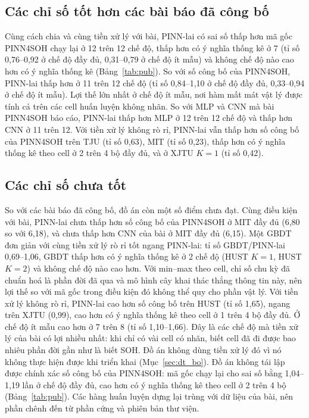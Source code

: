 \subsection{Các chỉ số tốt hơn các bài báo đã công bố}
Cùng cách chia và cùng tiền xử lý với bài, PINN-lai có sai số thấp hơn mã gốc PINN4SOH chạy lại ở 12 trên 12 chế độ, thấp hơn có ý nghĩa thống kê ở 7 (tỉ số 0{,}76--0{,}92 ở chế độ đầy đủ, 0{,}31--0{,}79 ở chế độ ít mẫu) và không chế độ nào cao hơn có ý nghĩa thống kê (Bảng~\ref{tab:pub}). So với số công bố của PINN4SOH, PINN-lai thấp hơn ở 11 trên 12 chế độ (tỉ số 0{,}84--1{,}10 ở chế độ đầy đủ, 0{,}33--0{,}94 ở chế độ ít mẫu). Lợi thế lớn nhất ở chế độ ít mẫu, nơi hàm mất mát vật lý được tính cả trên các cell huấn luyện không nhãn. So với MLP và CNN mà bài PINN4SOH báo cáo, PINN-lai thấp hơn MLP ở 12 trên 12 chế độ và thấp hơn CNN ở 11 trên 12. Với tiền xử lý không rò rỉ, PINN-lai vẫn thấp hơn số công bố của PINN4SOH trên TJU (tỉ số 0{,}63), MIT (tỉ số 0{,}23), thấp hơn có ý nghĩa thống kê theo cell ở 2 trên 4 bộ đầy đủ, và ở XJTU $K = 1$ (tỉ số 0{,}42).

\subsection{Các chỉ số chưa tốt}
So với các bài báo đã công bố, đồ án còn một số điểm chưa đạt. Cùng điều kiện với bài, PINN-lai chưa thấp hơn số công bố của PINN4SOH ở MIT đầy đủ (6{,}80 so với 6{,}18), và chưa thấp hơn CNN của bài ở MIT đầy đủ (6{,}15). Một GBDT đơn giản với cùng tiền xử lý rò rỉ tốt ngang PINN-lai: tỉ số GBDT/PINN-lai 0{,}69--1{,}06, GBDT thấp hơn có ý nghĩa thống kê ở 2 chế độ (HUST $K = 1$, HUST $K = 2$) và không chế độ nào cao hơn. Với min--max theo cell, chỉ số chu kỳ đã chuẩn hoá là phần đời đã qua và mô hình cây khai thác thẳng thông tin này, nên lợi thế so với mã gốc trong điều kiện đó không thể quy cho phần vật lý. Với tiền xử lý không rò rỉ, PINN-lai cao hơn số công bố trên HUST (tỉ số 1{,}65), ngang trên XJTU (0{,}99), cao hơn có ý nghĩa thống kê theo cell ở 1 trên 4 bộ đầy đủ. Ở chế độ ít mẫu cao hơn ở 7 trên 8 (tỉ số 1{,}10--1{,}66). Đây là các chế độ mà tiền xử lý của bài có lợi nhiều nhất: khi chỉ có vài cell có nhãn, biết cell đã đi được bao nhiêu phần đời gần như là biết SOH. Đồ án không dùng tiền xử lý đó vì nó không thực hiện được khi triển khai (Mục~\ref{sec:dt_bo}). Đồ án không tái lập được chính xác số công bố của PINN4SOH: mã gốc chạy lại cho sai số bằng 1{,}04--1{,}19 lần ở chế độ đầy đủ, cao hơn có ý nghĩa thống kê theo cell ở 2 trên 4 bộ (Bảng~\ref{tab:pub}). Các hàng huấn luyện dựng lại trùng với dữ liệu của bài, nên phần chênh đến từ phần cứng và phiên bản thư viện.

